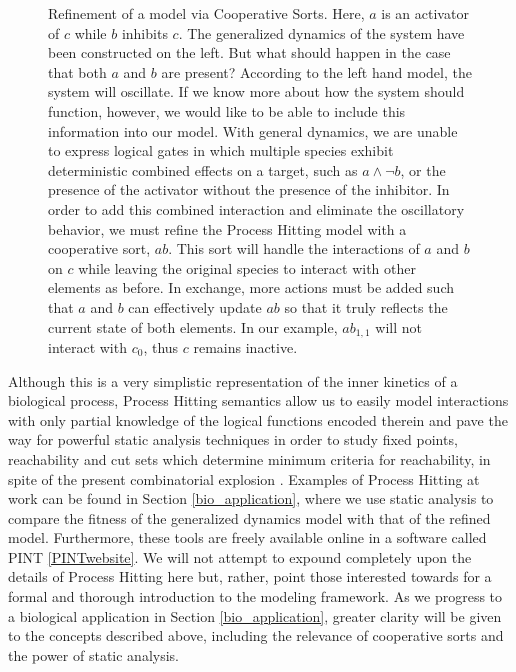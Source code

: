 \documentclass{article}
\begin{document}
\begin{figure}[h]
\begin{subfigure}[b]{0.50\textwidth}
\end{subfigure}
\caption{Refinement of a model via Cooperative Sorts. Here, $a$ is an activator of $c$ while $b$ inhibits $c$. The generalized dynamics of the system have been constructed on the left. But what should happen in the case that both $a$ and $b$ are present? According to the left hand model, the system will oscillate. If we know more about how the system should function, however, we would like to be able to include this information into our model. With general dynamics, we are unable to express logical gates in which multiple species exhibit deterministic combined effects on a target, such as $a\wedge \neg b$, or the presence of the activator without the presence of the inhibitor. In order to add this combined interaction and eliminate the oscillatory behavior, we must refine the Process Hitting model with a cooperative sort, $ab$. This sort will handle the interactions of $a$ and $b$ on $c$ while leaving the original species to interact with other elements as before. In exchange, more actions must be added such that $a$ and $b$ can effectively update $ab$ so that it truly reflects the current state of both elements. In our example,  $ab_{1,1}$ will not interact with $c_0$, thus $c$ remains inactive. }
\label{PH_coop}
\end{figure}

Although this is a very simplistic representation of the inner kinetics of a biological process, Process Hitting semantics allow us to easily model interactions with only partial knowledge of the logical functions encoded therein and pave the way for powerful static analysis techniques in order to study fixed points, reachability and cut sets which determine minimum criteria for reachability, in spite of the present combinatorial explosion \cite{FPMR13-CS2Bio, PMR10-TCSB}. Examples of Process Hitting at work can be found in Section \ref{bio_application}, where we use static analysis to compare the fitness of the generalized dynamics model with that of the refined model. Furthermore, these tools are freely available online in a software called PINT \ref{PINTwebsite}. We will not attempt to expound completely upon the details of Process Hitting here but, rather, point those interested towards \cite{PMR10-TCSB} for a formal and thorough introduction to the modeling framework. As we progress to a biological application in Section \ref{bio_application}, greater clarity will be given to the concepts described above, including the relevance of cooperative sorts and the power of static analysis.
\end{document}
